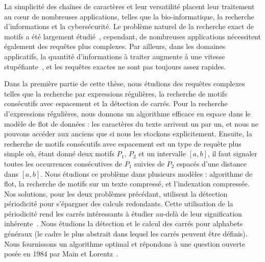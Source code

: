 La simplicité des chaînes de caractères et leur versatilité placent leur traitement au cœur de nombreuses applications, telles que la bio-informatique, la recherche d'informations et la cybersécurité.
Le problème naturel de la recherche exact de motifs a été largement étudié~\cite{charras2004handbook}, cependant, de nombreuses applications nécessitent également des requêtes plus complexes. Par ailleurs, dans les domaines applicatifs, la quantité d'informations à traiter augmente à une vitesse stupéfiante~\cite{muir2016real}, et les requêtes exactes ne sont pas toujours assez rapides.

Dans la première partie de cette thèse, nous étudions des requêtes complexes telles que la recherche par expressions régulières, la recherche de motifs consécutifs avec espacement et la détection de carrés.
Pour la recherche d'expressions régulières, nous donnons un algorithme efficace en espace dans le modèle de flot de données : les caractères du texte arrivent un par un, et nous ne pouvons accéder aux anciens que si nous les stockons explicitement.
Ensuite, la recherche de motifs consécutifs avec espacement est un type de requête plus simple où, étant donné deux motifs $P_1$, $P_2$ et un intervalle $[a, b]$, il faut signaler toutes les occurrences consécutives de $P_1$ suivies de $P_2$ espacés d'une distance dans $[a, b]$. Nous étudions ce problème dans plusieurs modèles : algorithme de flot, la recherche de motifs sur un texte compressé, et l'indexation compressée.
Nos solutions, pour les deux problèmes précédant, utilisent la détection périodicité pour s'épargner des calculs redondants. Cette utilisation de la périodicité rend les carrés intéressants à étudier au-delà de leur signification inhérente~\cite{Kolpakov2003}. Nous étudions la détection et le calcul des carrés pour alphabets généraux (le cadre le plus abstrait dans lequel les carrés peuvent être définis). Nous fournissons un algorithme optimal et répondons à une question ouverte posée en 1984 par Main et Lorentz~\cite{Main1984}.

